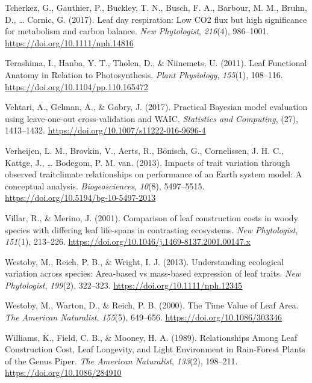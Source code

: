 \documentclass[
  12pt,
  letterpaper,
  DIV=11,
  numbers=noendperiod]{scrartcl}
\newlength{\cslhangindent}
\newlength{\cslentryspacingunit} %
\newenvironment{CSLReferences}[2] %
 {%
  \setlength{\parindent}{0pt}
  \ifodd #1
  \let\oldpar\par
  \def\par{\hangindent=\cslhangindent\oldpar}
  \fi
  \setlength{\parskip}{#2\cslentryspacingunit}
 }%
 {}
\begin{document}
\begin{CSLReferences}{1}{0}
\leavevmode{}%
Tcherkez, G., Gauthier, P., Buckley, T. N., Busch, F. A., Barbour, M.
M., Bruhn, D., \ldots{} Cornic, G. (2017). Leaf day respiration: Low
{CO2} flux but high significance for metabolism and carbon balance.
\emph{New Phytologist}, \emph{216}(4), 986--1001.
\url{https://doi.org/10.1111/nph.14816}

\leavevmode{}%
Terashima, I., Hanba, Y. T., Tholen, D., \& Niinemets, U. (2011). Leaf
{Functional Anatomy} in {Relation} to {Photosynthesis}. \emph{Plant
Physiology}, \emph{155}(1), 108--116.
\url{https://doi.org/10.1104/pp.110.165472}

\leavevmode{}%
Vehtari, A., Gelman, A., \& Gabry, J. (2017). Practical {Bayesian} model
evaluation using leave-one-out cross-validation and {WAIC}.
\emph{Statistics and Computing}, (27), 1413--1432.
\url{https://doi.org/10.1007/s11222-016-9696-4}

\leavevmode{}%
Verheijen, L. M., Brovkin, V., Aerts, R., Bönisch, G., Cornelissen, J.
H. C., Kattge, J., \ldots{} Bodegom, P. M. van. (2013). Impacts of trait
variation through observed trait\textendash climate relationships on
performance of an {Earth} system model: A conceptual analysis.
\emph{Biogeosciences}, \emph{10}(8), 5497--5515.
\url{https://doi.org/10.5194/bg-10-5497-2013}

\leavevmode{}%
Villar, R., \& Merino, J. (2001). Comparison of leaf construction costs
in woody species with differing leaf life-spans in contrasting
ecosystems. \emph{New Phytologist}, \emph{151}(1), 213--226.
\url{https://doi.org/10.1046/j.1469-8137.2001.00147.x}

\leavevmode{}%
Westoby, M., Reich, P. B., \& Wright, I. J. (2013). Understanding
ecological variation across species: {Area-based} vs mass-based
expression of leaf traits. \emph{New Phytologist}, \emph{199}(2),
322--323. \url{https://doi.org/10.1111/nph.12345}

\leavevmode{}%
Westoby, M., Warton, D., \& Reich, P. B. (2000). The {Time Value} of
{Leaf Area}. \emph{The American Naturalist}, \emph{155}(5), 649--656.
\url{https://doi.org/10.1086/303346}

\leavevmode{}%
Williams, K., Field, C. B., \& Mooney, H. A. (1989). Relationships
{Among Leaf Construction Cost}, {Leaf Longevity}, and {Light
Environment} in {Rain-Forest Plants} of the {Genus Piper}. \emph{The
American Naturalist}, \emph{133}(2), 198--211.
\url{https://doi.org/10.1086/284910}


\end{CSLReferences}
\end{document}
